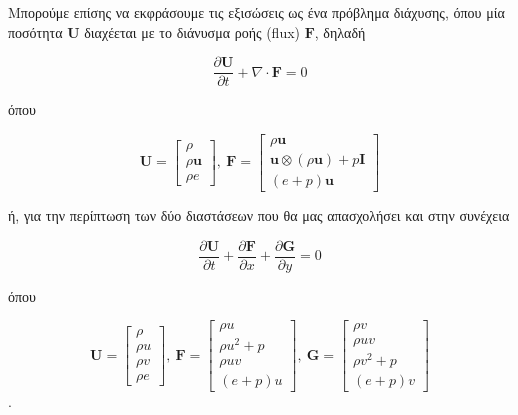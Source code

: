 Μπορούμε επίσης να εκφράσουμε τις εξισώσεις ως ένα πρόβλημα διάχυσης, όπου μία ποσότητα $\mathbf{U}$ διαχέεται με το διάνυσμα ροής (flux) $\mathbf{F}$, δηλαδή

\begin{equation*}
    \frac{\partial \mathbf{U}}{\partial t} + \nabla \cdot \mathbf{F} = 0
\end{equation*}

όπου

\begin{equation*}
    \mathbf{U} = 
        \begin{bmatrix}
            \rho \\
            \rho \mathbf{u} \\
            \rho e
        \end{bmatrix}
    , \ 
    \mathbf{F} =
        \begin{bmatrix}
            \rho \mathbf{u} \\
            \mathbf{u} \otimes \left( \rho \mathbf{u} \right) + p \mathbf{I} \\
            (e + p) \mathbf{u}
        \end{bmatrix}
\end{equation*}

ή, για την περίπτωση των δύο διαστάσεων που θα μας απασχολήσει και στην συνέχεια

\begin{equation*}
    \frac{\partial \mathbf{U}}{\partial t} + \frac{\partial \mathbf{F}}{\partial x} + \frac{\partial \mathbf{G}}{\partial y} = 0
\end{equation*}

όπου

\begin{equation*}
    \mathbf{U} = 
        \begin{bmatrix}
            \rho \\
            \rho u \\
            \rho v \\
            \rho e
        \end{bmatrix}
    , \ 
    \mathbf{F} =
        \begin{bmatrix}
            \rho u \\
            \rho u^2 + p \\
            \rho u v \\
            (e + p) u
        \end{bmatrix}
    , \ 
    \mathbf{G} =
        \begin{bmatrix}
            \rho v \\
            \rho u v \\
            \rho v^2 + p \\
            (e + p) v 
        \end{bmatrix}
\end{equation*}
.

